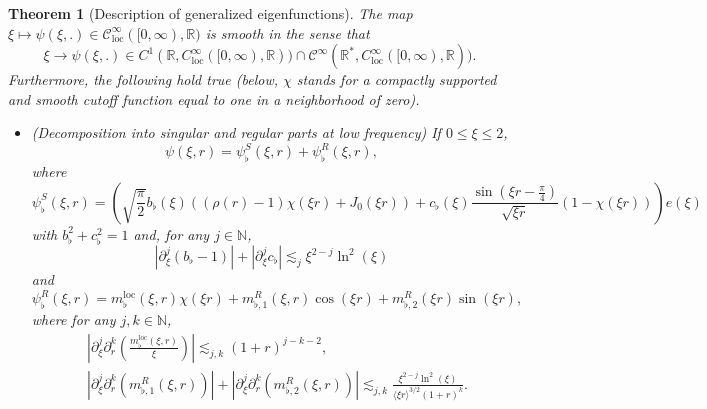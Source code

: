 \documentclass[11 pt]{amsart}
\newcommand{\tmop}[1]{\ensuremath{\operatorname{#1}}}
\newtheorem{thm}{Theorem}[section]
\theoremstyle{definition}
\theoremstyle{remark}
\numberwithin{equation}{section}
\begin{document}
\begin{thm}[Description of generalized eigenfunctions] \label{toohigh} The map $\xi \mapsto \psi (\xi, .) \in \mathcal{C}^\infty_{\tmop{loc}} ([0,\infty), \mathbb{R})$ is smooth in the sense that \[ \xi \rightarrow \psi (\xi, .) \in C^1 (\mathbb{R}, C_{\tmop{loc}}^{\infty}
   ([0,\infty), \mathbb{R})) \cap \mathcal{C}^\infty (\mathbb{R}^{\ast},
   C_{\tmop{loc}}^{\infty} ([0,\infty), \mathbb{R})). \]
Furthermore, the following hold true (below, $\chi$ stands for a compactly supported and smooth cutoff function equal to one in a neighborhood of zero).
\begin{itemize}
\item[(i)](Decomposition into singular and regular parts at low  frequency) If $0 \leqslant \xi \leqslant 2$,
\begin{equation} \label{decomposition-psi-flat}
\psi (\xi, r) = \psi_{\flat}^S (\xi, r) + \psi_{\flat}^R (\xi,
     r), 
\end{equation}
where
\begin{equation} \label{id:psi-flat-S} \psi_{\flat}^S (\xi, r) = \left( \sqrt{\frac{\pi}{2}} b_{\flat} (\xi)
   ((\rho (r) - 1) \chi(\xi r) + J_0 (\xi r)) + c_{\flat} (\xi)
   \frac{\sin \left( \xi r - \frac{\pi}{4} \right)}{\sqrt{\xi r}} (1 -
   \chi(\xi r)) \right) e (\xi)
\end{equation}
with $b_{\flat}^2 + c_{\flat}^2 = 1$ and, for any $j \in \mathbb{N}$,
\begin{equation} \label{bd:estimates-b-c-flat}
| \partial_{\xi}^j (b_{\flat} - 1) | + | \partial_{\xi}^j c_{\flat} |
   \lesssim_j \xi^{2 - j} \ln^2 (\xi) 
\end{equation}
and
\begin{equation} \label{id:psi-flat-R}
\psi_{\flat}^R (\xi, r) = m_{\flat}^{\tmop{loc}} (\xi, r)  \chi (\xi r)+ m_{\flat, 1}^R (\xi, r) \cos (\xi r) + m_{\flat, 2}^R (\xi r) \sin
   (\xi r),
\end{equation}
where for any $j, k \in \mathbb{N}$,
\begin{align} \label{bd:m-flat-loc}
&\left| \partial_{\xi}^j \partial_r^k \left( \frac{m_{\flat}^{\tmop{loc}}
   (\xi, r)}{\xi} \right) \right| \lesssim_{j, k} (1 + r)^{j - k-2}, \\
\label{bd:psi-flat-R}& | \partial_{\xi}^j \partial_r^k (m_{\flat, 1}^R (\xi, r)) | + |
   \partial_{\xi}^j \partial_r^k (m_{\flat, 2}^R (\xi, r)) | \lesssim_{j, k}
   \frac{\xi^{2 - j} \ln^2 (\xi)}{\langle \xi r \rangle^{3 / 2} (1 + r)^k} . 
\end{align}



\end{itemize}
\end{thm}
\end{document}
